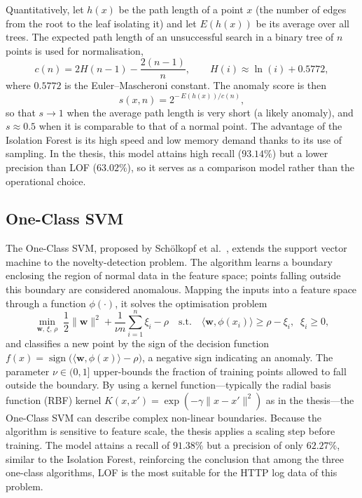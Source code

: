 \documentclass[../main.tex]{subfiles}
\begin{document}
Quantitatively, let $h(x)$ be the path length of a point $x$ (the number of
edges from the root to the leaf isolating it) and let $E(h(x))$ be its
average over all trees. The expected path length of an unsuccessful search in
a binary tree of $n$ points is used for normalisation,
\begin{equation}
  c(n) = 2H(n-1) - \frac{2(n-1)}{n},
  \qquad H(i) \approx \ln(i) + 0.5772,
  \label{eq:cn}
\end{equation}
where $0.5772$ is the Euler--Mascheroni constant. The anomaly score is then
\begin{equation}
  s(x,n) = 2^{-\,E(h(x))/c(n)} ,
  \label{eq:ifscore}
\end{equation}
so that $s \to 1$ when the average path length is very short (a likely
anomaly), and $s \approx 0.5$ when it is comparable to that of a normal
point. The advantage of the
Isolation Forest is its high speed and low memory demand thanks to its use
of sampling. In the thesis, this model attains high recall ($93.14\%$) but
a lower precision than LOF ($63.02\%$), so it serves as a comparison model
rather than the operational choice.

\subsection{One-Class SVM}

The One-Class SVM, proposed by Sch\"{o}lkopf et al.~\cite{scholkopf1999},
extends the support vector machine to the novelty-detection problem. The
algorithm learns a boundary enclosing the region of normal data in the
feature space; points falling outside this boundary are considered
anomalous. Mapping the inputs into a feature space through a function
$\phi(\cdot)$, it solves the optimisation problem
\begin{equation}
  \min_{\mathbf{w},\,\xi,\,\rho}\;
  \frac{1}{2}\lVert \mathbf{w}\rVert^{2}
  + \frac{1}{\nu n}\sum_{i=1}^{n}\xi_i - \rho
  \quad\text{s.t.}\quad
  \langle \mathbf{w}, \phi(x_i)\rangle \geq \rho - \xi_i,\;\; \xi_i \geq 0,
  \label{eq:ocsvm}
\end{equation}
and classifies a new point by the sign of the decision function
$f(x) = \operatorname{sign}\!\big(\langle \mathbf{w}, \phi(x)\rangle - \rho\big)$,
a negative sign indicating an anomaly. The parameter $\nu \in (0,1]$ upper-bounds
the fraction of training points allowed to fall outside the boundary. By
using a kernel function---typically the radial basis function (RBF) kernel
$K(x,x') = \exp(-\gamma\lVert x - x'\rVert^{2})$ as in the thesis---the
One-Class SVM can describe complex non-linear boundaries. Because the
algorithm is sensitive to feature scale, the thesis applies a scaling step
before training. The model attains a
recall of $91.38\%$ but a precision of only $62.27\%$, similar to the
Isolation Forest, reinforcing the conclusion that among the three one-class
algorithms, LOF is the most suitable for the HTTP log data of this problem.
\end{document}

